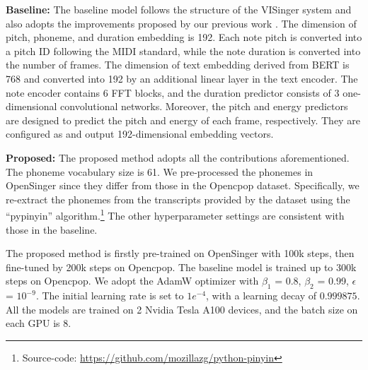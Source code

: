\textbf{Baseline:}
The baseline model follows the structure of the VISinger system \cite{zhang2021visinger} and also adopts the improvements proposed by our previous work \cite{zhou22f_interspeech}.
The dimension of pitch, phoneme, and duration embedding is 192.
Each note pitch is converted into a pitch ID following the MIDI standard\cite{midi}, while the note duration is converted into the number of frames. 
The dimension of text embedding derived from BERT is 768 and converted into 192 by an additional linear layer in the text encoder. 
The note encoder contains 6 FFT blocks, and the duration predictor consists of 3 one-dimensional convolutional networks.
Moreover, the pitch and energy predictors are designed to predict the pitch and energy of each frame, respectively. They are configured as \cite{zhou22f_interspeech} and output 192-dimensional embedding vectors.

\textbf{Proposed:}
The proposed method adopts all the contributions aforementioned.
The phoneme vocabulary size is 61.
We pre-processed the phonemes in OpenSinger since they differ from those in the Opencpop dataset.
Specifically, we re-extract the phonemes from the transcripts provided by the dataset using the ``pypinyin'' algorithm.\footnote{Source-code: \href{https://github.com/mozillazg/python-pinyin}{https://github.com/mozillazg/python-pinyin}}
The other hyperparameter settings are consistent with those in the baseline.

The proposed method is firstly pre-trained on OpenSinger with 100k steps, then fine-tuned by 200k steps on Opencpop. The baseline model is trained up to 300k steps on Opencpop. 
We adopt the AdamW\cite{loshchilov2017decoupled} optimizer with $\beta_1$ = 0.8, $\beta_2$ = 0.99, $\epsilon$ = $10^{-9}$. The initial learning rate is set to $1e^{-4}$, with a learning decay of $0.999875$.
All the models are trained on 2 Nvidia Tesla A100 devices, and the batch size on each GPU is 8.




